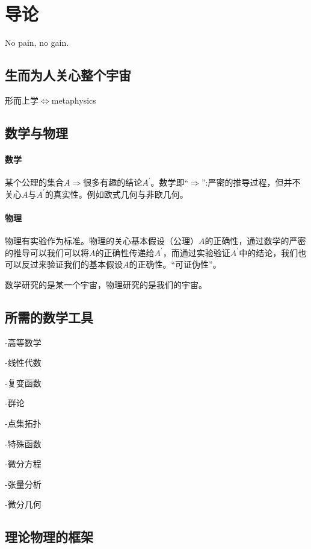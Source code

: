 \chapter{导论}
\label{intro}

No pain, no gain.

\section{生而为人关心整个宇宙}

形而上学$\Leftrightarrow$metaphysics

\section{数学与物理}

\subsubsection{数学}
某个公理的集合$A\Rightarrow$很多有趣的结论$A^\prime$。数学即“$\Rightarrow$”:严密的推导过程，但并不关心$A$与$A^\prime$的真实性。例如欧式几何与非欧几何。

\subsubsection{物理}
物理有实验作为标准。物理的关心基本假设（公理）$A$的正确性，通过数学的严密的推导可以我们可以将$A$的正确性传递给$A^\prime$，而通过实验验证$A^\prime$中的结论，我们也可以反过来验证我们的基本假设$A$的正确性。“可证伪性”。


数学研究的是某一个宇宙，物理研究的是我们的宇宙。

\section{所需的数学工具}

-高等数学

-线性代数

-复变函数

-群论

-点集拓扑

-特殊函数

-微分方程

-张量分析

-微分几何

\section{理论物理的框架}

